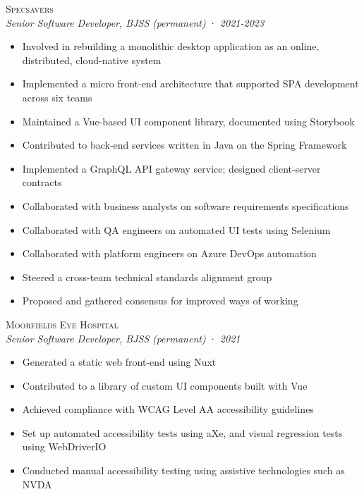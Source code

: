 \documentclass[a4paper,10pt]{article}
\newcommand{\resumeSubheading}[5][12pt]{
  \vspace{#1}
  {\scshape{#2}} \\
  \textit{\small{#3}} \textit{\small{(#4)}} · \textit{\small{#5}}
  \vspace{2pt}
}
\newcommand{\resumeListStart}{\begin{itemize}}
\newcommand{\resumeListEnd}{\end{itemize}}
\newcommand{\resumeItem}[1]{
  \item[\-·]\small{{#1\vspace{1pt}}}
}
\begin{document}
  \begin{minipage}{\textwidth}
    \resumeSubheading
      {Specsavers}
      {Senior Software Developer, BJSS}
      {permanent}
      {2021-2023}
    \resumeListStart
      \resumeItem{Involved in rebuilding a monolithic desktop application as an online, distributed, cloud-native system}
      \resumeItem{Implemented a micro front-end architecture that supported SPA development across six teams}
      \resumeItem{Maintained a Vue-based UI component library, documented using Storybook}
      \resumeItem{Contributed to back-end services written in Java on the Spring Framework}
      \resumeItem{Implemented a GraphQL API gateway service; designed client-server contracts}
      \resumeItem{Collaborated with business analysts on software requirements specifications}
      \resumeItem{Collaborated with QA engineers on automated UI tests using Selenium}
      \resumeItem{Collaborated with platform engineers on Azure DevOps automation}
      \resumeItem{Steered a cross-team technical standards alignment group}
      \resumeItem{Proposed and gathered consensus for improved ways of working}
    \resumeListEnd
  \end{minipage}


  \begin{minipage}{\textwidth}
    \resumeSubheading
      {Moorfields Eye Hospital}
      {Senior Software Developer, BJSS}
      {permanent}
      {2021}
    \resumeListStart
      \resumeItem{Generated a static web front-end using Nuxt}
      \resumeItem{Contributed to a library of custom UI components built with Vue}
      \resumeItem{Achieved compliance with WCAG Level AA accessibility guidelines}
      \resumeItem{Set up automated accessibility tests using aXe, and visual regression tests using WebDriverIO}
      \resumeItem{Conducted manual accessibility testing using assistive technologies such as NVDA}
    \resumeListEnd
  \end{minipage}
\end{document}
